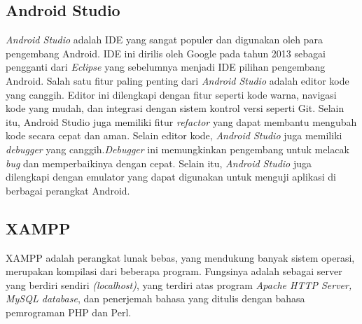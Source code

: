 \subsection{Android Studio}
\emph{Android Studio} adalah IDE yang sangat populer dan digunakan oleh para pengembang Android. IDE ini dirilis oleh Google pada tahun 2013 sebagai pengganti dari \emph{Eclipse} yang sebelumnya menjadi IDE pilihan pengembang Android.
Salah satu fitur paling penting dari \emph{Android Studio} adalah editor kode yang canggih. Editor ini dilengkapi dengan fitur seperti kode warna, navigasi kode yang mudah, dan integrasi dengan sistem kontrol versi seperti Git. Selain itu, Android Studio juga memiliki fitur \emph{refactor} yang dapat membantu mengubah kode secara cepat dan aman.
Selain editor kode, \emph{Android Studio} juga memiliki \emph{debugger} yang canggih.\emph{Debugger} ini memungkinkan pengembang untuk melacak \emph{bug} dan memperbaikinya dengan cepat. Selain itu, \emph{Android Studio} juga dilengkapi dengan emulator yang dapat digunakan untuk menguji aplikasi di berbagai perangkat Android. \cite{dims}

\subsection{XAMPP}
XAMPP adalah perangkat lunak bebas, yang mendukung banyak sistem operasi, merupakan kompilasi dari beberapa program. Fungsinya adalah sebagai server yang berdiri sendiri \emph{(localhost)}, yang terdiri atas program \emph{Apache HTTP Server, MySQL database}, dan penerjemah bahasa yang ditulis dengan bahasa pemrograman PHP dan Perl. \cite{faz}

